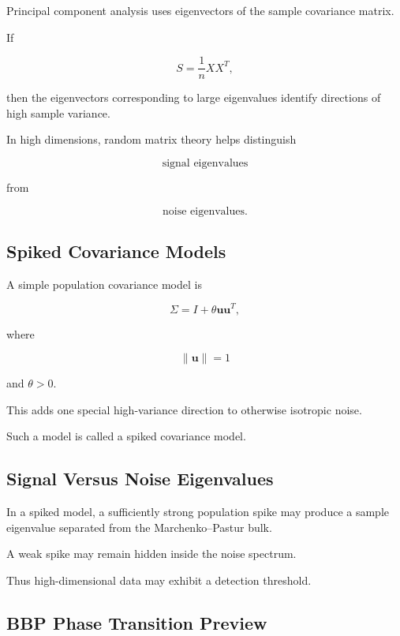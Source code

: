 Principal component analysis uses eigenvectors of the sample covariance
matrix.

If

\[
S
=
\frac1nXX^T,
\]

then the eigenvectors corresponding to large eigenvalues identify
directions of high sample variance.

In high dimensions, random matrix theory helps distinguish

\[
\boxed{
\text{signal eigenvalues}
}
\]

from

\[
\boxed{
\text{noise eigenvalues}.
}
\]

\subsection{Spiked Covariance Models}
\label{subsec:spiked-covariance}

A simple population covariance model is

\[
\boxed{
\Sigma
=
I
+
\theta
\mathbf{u}\mathbf{u}^T,
}
\]

where

\[
\|\mathbf{u}\|=1
\]

and \(\theta>0\).

This adds one special high-variance direction to otherwise isotropic
noise.

Such a model is called a spiked covariance model.

\subsection{Signal Versus Noise Eigenvalues}
\label{subsec:signal-noise-eigenvalues}

In a spiked model, a sufficiently strong population spike may produce a
sample eigenvalue separated from the Marchenko--Pastur bulk.

A weak spike may remain hidden inside the noise spectrum.

Thus high-dimensional data may exhibit a detection threshold.

\subsection{BBP Phase Transition Preview}
\label{subsec:bbp-transition}

